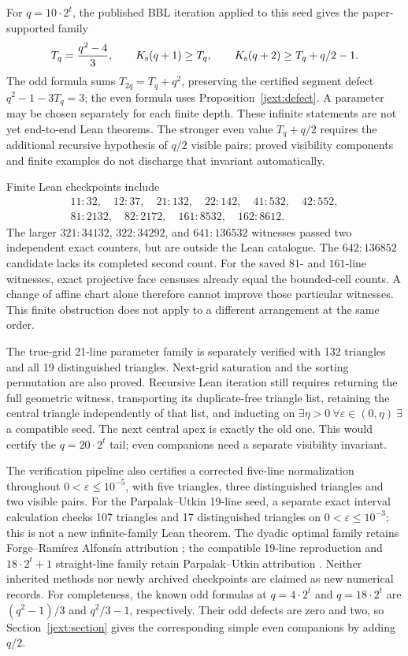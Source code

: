 For $q=10\cdot2^t$, the published BBL iteration applied to this seed gives
the paper-supported family
\begin{equation}
 T_q=\frac{q^2-4}{3},\qquad
 K_{\mathrm s}(q+1)\ge T_q,\qquad
 K_{\mathrm s}(q+2)\ge T_q+q/2-1.
 \label{jfam:families}
\end{equation}
The odd formula sums $T_{2q}=T_q+q^2$, preserving the certified segment
defect $q^2-1-3T_q=3$; the even formula uses
Proposition~\ref{jext:defect}.  A parameter may be chosen separately
for each finite depth.  These infinite statements are not yet
end-to-end Lean theorems.  The stronger even value $T_q+q/2$ requires
the additional recursive hypothesis of $q/2$ visible pairs; proved
visibility components and finite examples do not discharge that
invariant automatically.

Finite Lean checkpoints include
\[
 \begin{gathered}
 11:32,\quad12:37,\quad21:132,\quad22:142,\quad41:532,\quad42:552,\\
 81:2132,\quad82:2172,\quad161:8532,\quad162:8612.
 \end{gathered}
\]
The larger $321:34132$, $322:34292$, and $641:136532$ witnesses passed
two independent exact counters, but are outside the Lean catalogue.
The $642:136852$ candidate lacks its completed second count.
For the saved $81$- and $161$-line witnesses, exact projective face
censuses already equal the bounded-cell counts. A change of affine chart
alone therefore cannot improve those particular witnesses. This finite
obstruction does not apply to a different arrangement at the same order.

The true-grid 21-line parameter family is separately verified with
132 triangles and all 19 distinguished triangles.  Next-grid saturation
and the sorting permutation are also proved.  Recursive Lean iteration
still requires returning the full geometric witness, transporting its
duplicate-free triangle list, retaining the central triangle independently
of that list, and inducting on
$\exists\eta>0\ \forall\varepsilon\in(0,\eta)\ \exists$ a compatible seed.
The next central apex is exactly the old one.  This would certify the
$q=20\cdot2^t$ tail; even companions need a separate visibility invariant.

The verification pipeline also certifies a corrected five-line
normalization throughout $0<\varepsilon\le10^{-5}$, with five triangles,
three distinguished triangles and two visible pairs. For the
Parpalak--Utkin 19-line seed, a separate exact interval calculation
checks 107 triangles and 17 distinguished triangles on
$0<\varepsilon\le10^{-3}$; this is not a new infinite-family Lean theorem.
The dyadic optimal family retains Forge--Ram\'irez Alfons\'in attribution
\cite{forge1998}; the compatible 19-line reproduction and
$18\cdot2^t+1$ straight-line family retain Parpalak--Utkin attribution
\cite{parpalakutkin2026}.  Neither inherited methods nor newly archived
checkpoints are claimed as new numerical records.
For completeness, the known odd formulas at $q=4\cdot2^t$ and
$q=18\cdot2^t$ are $(q^2-1)/3$ and $q^2/3-1$, respectively.
Their odd defects are zero and two, so Section~\ref{jext:section}
gives the corresponding simple even companions by adding $q/2$.
